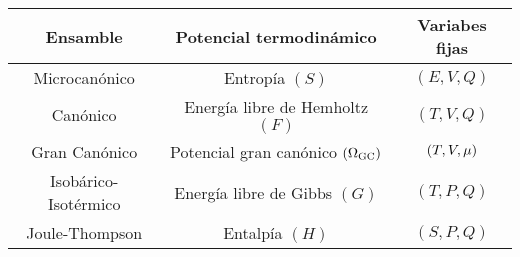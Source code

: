 \begin{center}
\begin{tabular}{|c|c|c|}
\hline
  Ensamble & Potencial termodinámico & Variabes fijas  \\
  \hline
  Microcanónico &Entropía $(S)$& $(E,V,Q)$ \\\hline
  Canónico&Energía libre de Hemholtz $(F)$ &$(T,V,Q)$\\\hline
  Gran Canónico&Potencial gran canónico $(\Omega_{\rm GC})$&$(T,V,\mu )$\\\hline
  Isobárico-Isotérmico&Energía libre de Gibbs $(G)$&$(T,P,Q)$\\\hline
  Joule-Thompson&Entalpía $(H)$&$(S,P,Q)$\\\hline
\end{tabular}
\end{center}











































































